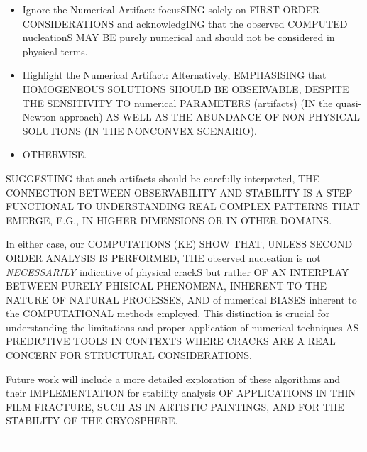 \begin{itemize}
    \item 
    Ignore the Numerical Artifact: focusSING solely on FIRST ORDER CONSIDERATIONS and acknowledgING that the observed COMPUTED nucleationS MAY BE purely numerical and should not be considered in physical terms.
    \item 
    Highlight the Numerical Artifact: Alternatively, EMPHASISING that HOMOGENEOUS SOLUTIONS SHOULD BE OBSERVABLE, DESPITE 
    THE SENSITIVITY TO numerical PARAMETERS (artifacts) (IN the quasi-Newton approach) AS WELL AS THE ABUNDANCE OF NON-PHYSICAL SOLUTIONS (IN THE NONCONVEX SCENARIO).
    \item 
    OTHERWISE.
\end{itemize}


SUGGESTING that such artifacts should be carefully interpreted, THE CONNECTION BETWEEN OBSERVABILITY AND STABILITY IS A STEP FUNCTIONAL TO UNDERSTANDING REAL COMPLEX PATTERNS THAT EMERGE, E.G., IN HIGHER DIMENSIONS OR IN OTHER DOMAINS.

In either case, our COMPUTATIONS (KE) SHOW THAT, UNLESS SECOND ORDER ANALYSIS IS PERFORMED, THE observed nucleation is not \emph{NECESSARILY} indicative of physical crackS but rather OF AN INTERPLAY BETWEEN PURELY PHISICAL PHENOMENA, INHERENT TO THE NATURE OF NATURAL PROCESSES, AND of numerical BIASES inherent to the COMPUTATIONAL methods employed. This distinction is crucial for understanding the limitations and proper application of numerical techniques AS PREDICTIVE TOOLS IN CONTEXTS WHERE CRACKS ARE A REAL CONCERN FOR STRUCTURAL CONSIDERATIONS.

Future work will include a more detailed exploration of these algorithms and their IMPLEMENTATION for stability analysis OF APPLICATIONS IN THIN FILM FRACTURE, SUCH AS IN ARTISTIC PAINTINGS, AND FOR THE STABILITY OF THE CRYOSPHERE.


-----

\clearpage



